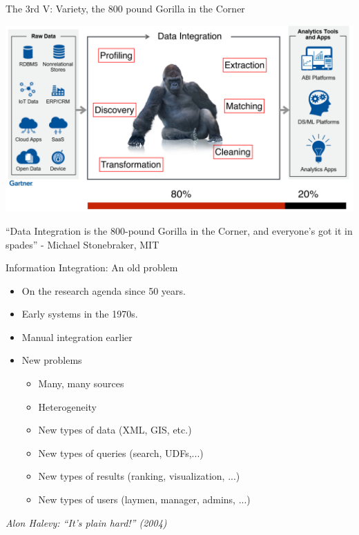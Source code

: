 \documentclass[aspectratio=169]{../latex_main/tntbeamer}  %
\begin{document}
\begin{frame}[c]{The 3rd V: Variety, the 800 pound Gorilla in the Corner}

    \centering
\includegraphics[width=1.0\textwidth]{bild4_gorilla}
    
     “Data Integration is the 800-pound Gorilla in the Corner, and everyone's got it in spades” - Michael Stonebraker, MIT
\end{frame}

\begin{frame}[c]{Information Integration: An old problem}
    \begin{itemize}
        \item On the research agenda since 50 years.
        \item Early systems in the 1970s.
        \item Manual integration earlier
        \item New problems
        \begin{itemize}
            \item Many, many sources
            \item Heterogeneity
            \item New types of data (XML, GIS, etc.)
            \item New types of queries (search, UDFs,...)
            \item New types of results (ranking, visualization, ...) 
            \item New types of users (laymen, manager, admins, ...)
        \end{itemize}
    \end{itemize}
    \textit{Alon Halevy: “It’s plain hard!” (2004)}
\end{frame}
\end{document}
